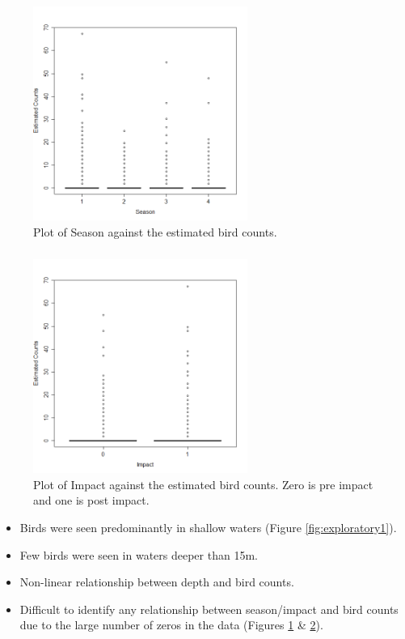 \begin{frame}
\frametitle{}
\begin{figure}[h]
  \centering
  \includegraphics[width=7cm]{season.png}
\caption{Plot of Season against the estimated bird counts.}
\label{fig:exploratory2}
\end{figure}
\end{frame}

\begin{frame}
\frametitle{}
\begin{figure}[h]
  \centering
  \includegraphics[width=7cm]{impact.png}
\caption{Plot of Impact against the estimated bird counts. Zero is pre impact and one is post impact.}
\label{fig:exploratory3}
\end{figure}
\end{frame}

\begin{frame}
\begin{itemize}
\item Birds were seen predominantly in shallow waters (Figure \ref{fig:exploratory1}).
\item Few birds were seen in waters deeper than 15m.  
\item Non-linear relationship between depth and bird counts.  
\item Difficult to identify any relationship between season/impact and bird counts due to the large number of zeros in the data (Figures \ref{fig:exploratory2} \&  \ref{fig:exploratory3}).
\end{itemize}
\end{frame}

